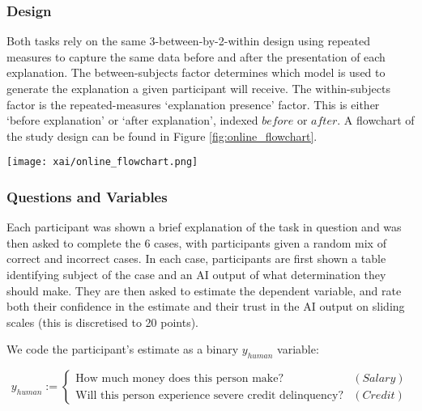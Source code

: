 \subsubsection{Design}
Both tasks rely on the same 3-between-by-2-within design using repeated measures to capture the same data before and after the presentation of each explanation. The between-subjects factor determines which model is used to generate the explanation a given participant will receive. The within-subjects factor is the repeated-measures `explanation presence' factor. This is either `before explanation' or `after explanation', indexed $before$ or $after$. A flowchart of the study design can be found in Figure \ref{fig:online_flowchart}.

\begin{figure*}[htbp]
    \centering
    \texttt{[image: xai/online\_flowchart.png]}
    \caption{Participants in the online study are sorted into six buckets, where each bucket is segregated by explanatory condition and task and shown a brief description of the task (i.e., each participant sees only one of the explanations in Figure \ref{fig:online_explanations}). Then, each participant is shown 6 cases. In each case, participants are shown an applicant profile and a AI output. Participants are asked to agree or disagree with the AI output. Then, participants are given explanations based on their explanatory condition scores. They are then asked again to agree or disagree with the AI output.}
    \label{fig:online_flowchart}
\end{figure*}

\subsubsection{Questions and Variables}\label{sssec:q_and_v}
Each participant was shown a brief explanation of the task in question and was then asked to complete the 6 cases, with participants given a random mix of correct and incorrect cases. In each case, participants are first shown a table identifying subject of the case and an AI output of what determination they should make. They are then asked to estimate the dependent variable, and rate both their confidence in the estimate and their trust in the AI output on sliding scales (this is discretised to 20 points).

We code the participant's estimate as a binary $y_{human}$ variable:

\begin{equation}
    y_{human} := \begin{cases}
        \text{How much money does this person make?} & (Salary) \\
        \text{Will this person experience severe credit delinquency?} & (Credit)
    \end{cases}
\end{equation}

